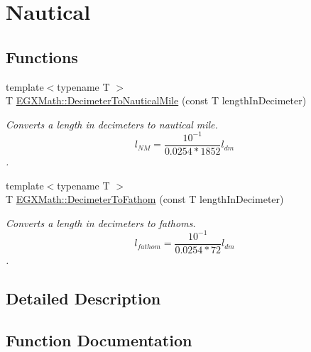 \hypertarget{group___e_g_x_math-_conversions-_length_conversions-_s_i-_decimeter-_nautical}{}\section{Nautical}
\label{group___e_g_x_math-_conversions-_length_conversions-_s_i-_decimeter-_nautical}
\subsection*{Functions}
\begin{DoxyCompactItemize}
\item 
{\footnotesize template$<$typename T $>$ }\\T \mbox{\hyperlink{group___e_g_x_math-_conversions-_length_conversions-_s_i-_decimeter-_nautical_ga6cc0e9987da30da6a30ddba50971ba2d}{E\+G\+X\+Math\+::\+Decimeter\+To\+Nautical\+Mile}} (const T length\+In\+Decimeter)
\begin{DoxyCompactList}\small\item\em Converts a length in decimeters to nautical mile. \[ l_{NM}= \frac{10^{-1}}{0.0254 * 1852} l_{dm} \]. \end{DoxyCompactList}\item 
{\footnotesize template$<$typename T $>$ }\\T \mbox{\hyperlink{group___e_g_x_math-_conversions-_length_conversions-_s_i-_decimeter-_nautical_ga1b0035d719274942290afe80600a2b27}{E\+G\+X\+Math\+::\+Decimeter\+To\+Fathom}} (const T length\+In\+Decimeter)
\begin{DoxyCompactList}\small\item\em Converts a length in decimeters to fathoms. \[ l_{fathom}= \frac{10^{-1}}{0.0254 * 72} l_{dm} \]. \end{DoxyCompactList}\end{DoxyCompactItemize}


\subsection{Detailed Description}


\subsection{Function Documentation}
\mbox{\label{group___e_g_x_math-_conversions-_length_conversions-_s_i-_decimeter-_nautical_ga1b0035d719274942290afe80600a2b27}} 
